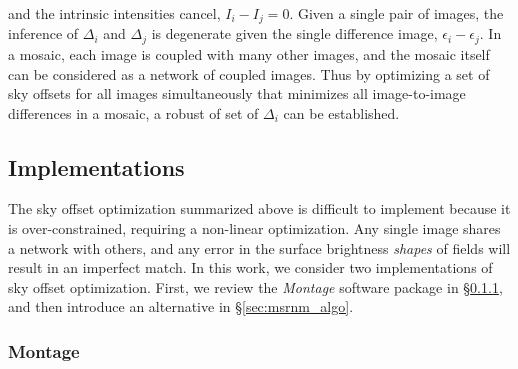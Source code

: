 \documentclass[iop]{emulateapj}
\newcommand{\sw}[1]{\textit{#1}} %
\newcommand{\Sec}[1]{\S\ref{sec:#1}}  %
\begin{document}
\noindent and the intrinsic intensities cancel, $I_i - I_j = 0$.
Given a single pair of images, the inference of $\Delta_i$ and $\Delta_j$ is degenerate given the single difference image, $\epsilon_i-\epsilon_j$.
In a mosaic, each image is coupled with many other images, and the mosaic itself can be considered as a network of coupled images.
Thus by optimizing a set of sky offsets for all images simultaneously that minimizes all image-to-image differences in a mosaic, a robust of set of $\Delta_i$ can be established.





\subsection{Implementations}
\label{sec:offset_algos}

The sky offset optimization summarized above is difficult to implement because it is over-constrained, requiring a non-linear optimization.
Any single image shares a network with others, and any error in the surface brightness \emph{shapes} of fields will result in an imperfect match.
In this work, we consider two implementations of sky offset optimization.
First, we review the \sw{Montage} software package in \Sec{montage_algo}, and then introduce an alternative in \Sec{msrnm_algo}.

\subsubsection{Montage}
\label{sec:montage_algo}
\end{document}
